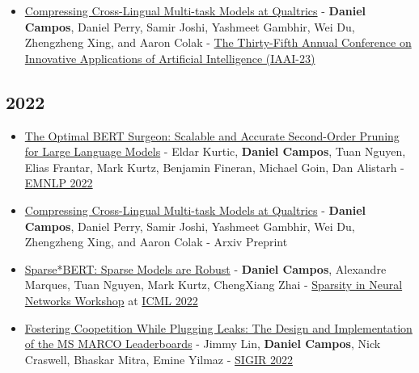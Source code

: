 \documentclass[line,margin]{res}
\begin{document}
\begin{resume}
\begin{itemize}
{Fourth Workshop on Simple and Efficient Natural Language Processing} at \href{https://2023.aclweb.org/}{ACL 2023} 
    \item \href{https://arxiv.org/abs/2211.15927}{Compressing Cross-Lingual Multi-task Models at Qualtrics} - \textbf{Daniel Campos}, Daniel Perry, Samir Joshi, Yashmeet Gambhir, Wei Du, Zhengzheng Xing, and Aaron Colak - \href{https://aaai.org/Conferences/AAAI-23/iaai-23-call/}{The Thirty-Fifth Annual Conference on Innovative Applications of Artificial Intelligence (IAAI-23)}
\end{itemize}
\subsection{2022}
\begin{itemize}
    \item \href{https://arxiv.org/abs/2203.07259}{The Optimal BERT Surgeon: Scalable and Accurate Second-Order Pruning for Large Language Models} - Eldar Kurtic, \textbf{Daniel Campos}, Tuan Nguyen, Elias Frantar, Mark Kurtz, Benjamin Fineran, Michael Goin, Dan Alistarh - \href{https://2022.emnlp.org/}{EMNLP 2022}
    \item \href{https://arxiv.org/abs/2211.15927}{Compressing Cross-Lingual Multi-task Models at Qualtrics} - \textbf{Daniel Campos}, Daniel Perry, Samir Joshi, Yashmeet Gambhir, Wei Du, Zhengzheng Xing, and Aaron Colak - Arxiv Preprint
    \item \href{https://arxiv.org/abs/2205.12452}{Sparse*BERT: Sparse Models are Robust} - \textbf{Daniel Campos}, Alexandre Marques, Tuan Nguyen, Mark Kurtz, ChengXiang Zhai - \href{https://sites.google.com/view/sparsity-workshop-2022}{Sparsity in Neural Networks Workshop} at \href{https://icml.cc/Conferences/2022}{ICML 2022}
    \item \href{https://www.microsoft.com/en-us/research/publication/fostering-coopetition-while-plugging-leaks-the-design-and-implementation-of-the-ms-marco-leaderboards/}{Fostering Coopetition While Plugging Leaks: The Design and Implementation of the MS MARCO Leaderboards} - Jimmy Lin, \textbf{Daniel Campos}, Nick Craswell, Bhaskar Mitra, Emine Yilmaz - \href{https://sigir.org/sigir2022/}{SIGIR 2022}
\end{itemize}

\end{resume}
\end{document}
